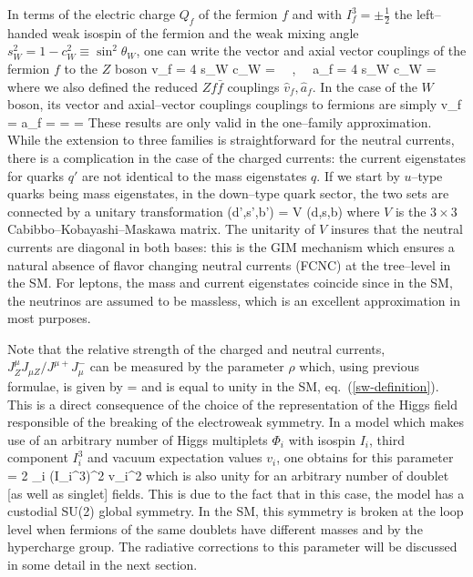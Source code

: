 In terms of the electric charge $Q_f$ of the fermion $f$ and with $I_f^3 
= \pm \frac{1}{2}$ the left--handed weak isospin of the fermion and the weak 
mixing angle $s_W^2=1-c_W^2 \equiv \sin^2 \theta_W$, one can write the vector 
and axial vector couplings of the fermion $f$ to the $Z$ boson 
\beq
v_f =  { 4 s_W c_W} = 
\ \ , \ \ a_f =  { 4 s_W c_W} = 
\label{Zffcouplings}
\eeq
where we also defined the reduced $Z f\bar f$ couplings $\hat{v}_f, \hat{a}_f$.
In the case of the $W$ boson, its vector and axial--vector couplings couplings 
to fermions are simply 
\beq
v_f = a_f =  =  = 
\label{Wffcouplings}
\eeq
These results are only valid in the one--family approximation. While the
extension  to three families is straightforward for the neutral currents, 
there is a complication in the case of the charged currents: the current 
eigenstates for quarks $q'$ are not identical to the mass eigenstates $q$. If
we start by $u$--type quarks being mass eigenstates, in the down--type
quark sector, the two sets are connected by a unitary transformation \cite{CKM}
\beq
(d',s',b') = V (d,s,b)
\eeq
where $V$ is the $3\!\times\!3$ Cabibbo--Kobayashi--Maskawa matrix. The 
unitarity
of $V$ insures that the neutral currents are diagonal in both bases: this is 
the GIM mechanism \cite{GIM} which ensures a natural absence of flavor changing
neutral currents (FCNC) at the tree--level in the SM. For leptons, the mass and
current  eigenstates coincide since in the SM, the neutrinos are assumed to
be  massless, which is an excellent  approximation in most purposes. \s

Note that the relative strength of the charged and neutral currents, $J^\mu_Z 
J_{\mu Z}/J^{ \mu +} J_\mu^-$ can be measured by the parameter $\rho$ 
\cite{rho-definition} which, using previous formulae, is given by
\beq
\rho=  
\label{rho-MWMZ}
\eeq
and is equal to unity in the SM, eq.~(\ref{sw-definition}). This is a 
direct consequence of the choice of the representation of the Higgs field 
responsible of the breaking of the electroweak symmetry. In a model which makes
use of an arbitrary number of Higgs multiplets $\Phi_i$ with isospin $I_i$,  
third component $I_i^3$ and vacuum expectation values $v_i$, one obtains for
this parameter
\beq
\rho= 
{2 \sum_i (I_i^3)^2 v_i^2}
\eeq
which is also unity for an arbitrary number of doublet [as well as singlet] 
fields. This is due to  the fact that in this case, the model has a
custodial SU(2) global symmetry. In the SM, this symmetry is broken at the
loop level when fermions of the same doublets have different masses and by the
hypercharge group. The radiative corrections to this parameter will be 
discussed in some detail in the next section.\s 

